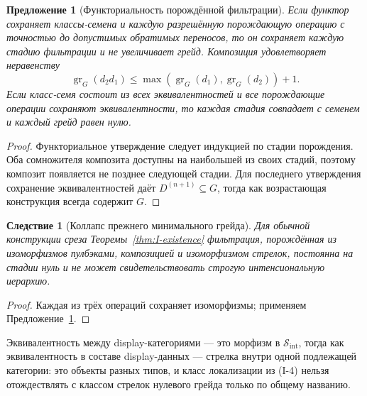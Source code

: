 \documentclass[11pt]{article}
\theoremstyle{plain}
\newtheorem{proposition}[theorem]{Предложение}
\newtheorem{corollary}[theorem]{Следствие}
\theoremstyle{definition}
\newcommand{\cS}{\mathcal{S}}
\newcommand{\Sint}{\cS_{\mathrm{int}}}
\newcommand{\gr}{\operatorname{gr}}
\begin{document}
\begin{proposition}[Функториальность порождённой фильтрации]\label{prop:grading}
Если функтор сохраняет классы-семена и каждую разрешённую порождающую операцию с точностью до допустимых обратимых переносов, то он сохраняет каждую стадию фильтрации и не увеличивает грейд. Композиция удовлетворяет неравенству
\[
 \gr_G(d_2 d_1) \le \max(\gr_G(d_1), \gr_G(d_2)) + 1.
\]
Если класс-семя состоит из всех эквивалентностей и все порождающие операции сохраняют эквивалентности, то каждая стадия совпадает с семенем и каждый грейд равен нулю.
\end{proposition}
\begin{proof}
Функториальное утверждение следует индукцией по стадии порождения. Оба сомножителя композита доступны на наибольшей из своих стадий, поэтому композит появляется не позднее следующей стадии. Для последнего утверждения сохранение эквивалентностей даёт $D^{(n+1)} \subseteq G$, тогда как возрастающая конструкция всегда содержит $G$.
\end{proof}

\begin{corollary}[Коллапс прежнего минимального грейда]\label{cor:grade-collapse}
Для обычной конструкции среза Теоремы~\ref{thm:I-existence} фильтрация, порождённая из изоморфизмов пулбэками, композицией и изоморфизмом стрелок, постоянна на стадии нуль и не может свидетельствовать строгую интенсиональную иерархию.
\end{corollary}
\begin{proof}
Каждая из трёх операций сохраняет изоморфизмы; применяем Предложение~\ref{prop:grading}.
\end{proof}
Эквивалентность между display-категориями — это морфизм в $\Sint$, тогда как эквивалентность в составе display-данных — стрелка внутри одной подлежащей категории: это объекты разных типов, и класс локализации из (I-4) нельзя отождествлять с классом стрелок нулевого грейда только по общему названию.
\end{document}
